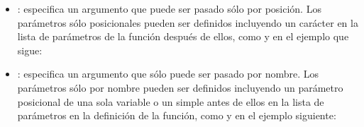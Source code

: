 \documentclass[a4,10pt,spanish]{sphinxmanual}
\begin{document}
\begin{description}
\begin{itemize}
\begin{sphinxVerbatim}[commandchars=\\\{\}]
   
\end{sphinxVerbatim}

\end{itemize}
\label{\detokenize{glossary:positional-only-parameter}}\begin{itemize}
\item {} 
\sphinxAtStartPar
{}: especifica un argumento que puede ser pasado sólo por posición.  Los parámetros sólo posicionales pueden ser definidos incluyendo un carácter \sphinxcode{\sphinxupquote{/}} en la lista de parámetros de la función después de ellos, como  y  en el ejemplo que sigue:

\begin{sphinxVerbatim}[commandchars=\\\{\}]
     
\end{sphinxVerbatim}

\end{itemize}
\label{\detokenize{glossary:keyword-only-parameter}}\begin{itemize}
\item {} 
\sphinxAtStartPar
{}: especifica un argumento que sólo puede ser pasado por nombre.  Los parámetros sólo por nombre pueden ser definidos incluyendo un parámetro posicional de una sola variable o un simple  antes de ellos en la lista de parámetros en la definición de la función, como  y  en el ejemplo siguiente:

\begin{sphinxVerbatim}[commandchars=\\\{\}]
     
\end{sphinxVerbatim}


\end{itemize}
\end{description}
\end{document}
